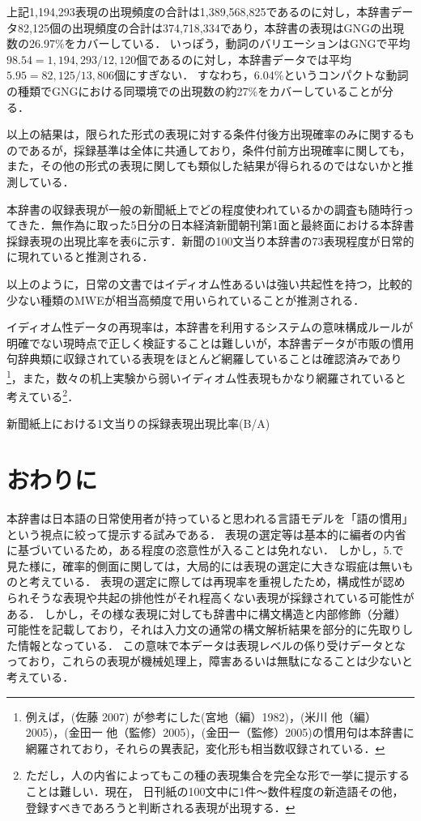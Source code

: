 \documentclass[japanese]{jnlp_1.4}
\begin{document}
上記1,194,293表現の出現頻度の合計は1,389,568,825であるのに対し，本辞書データ82,125個の出現頻度の合計は374,718,334であり，本辞書の表現はGNGの出現数の26.97\%をカバーしている．
いっぽう，動詞のバリエーションはGNGで平均$98.54 = 1,194,293/12,120$個であるのに対し，本辞書データでは平均$5.95=82,125/13,806$個にすぎない．
すなわち，6.04\%というコンパクトな動詞の種類でGNGにおける同環境での出現数の約27\%をカバーしていることが分る．

以上の結果は，限られた形式の表現に対する条件付後方出現確率のみに関するものであるが，採録基準は全体に共通しており，条件付前方出現確率に関しても，また，その他の形式の表現に関しても類似した結果が得られるのではないかと推測している．

本辞書の収録表現が一般の新聞紙上でどの程度使われているかの調査も随時行ってきた．無作為に取った5日分の日本経済新聞朝刊第1面と最終面における本辞書採録表現の出現比率を表6に示す．新聞の100文当り本辞書の73表現程度が日常的に現れていると推測される．

以上のように，日常の文書ではイディオム性あるいは強い共起性を持つ，比較的少ない種類のMWEが相当高頻度で用いられていることが推測される．

イディオム性データの再現率は，本辞書を利用するシステムの意味構成ルールが明確でない現時点で正しく検証することは難しいが，本辞書データが市販の慣用句辞典類に収録されている表現をほとんど網羅していることは確認済みであり\footnote{例えば，(佐藤 2007) が参考にした(宮地（編）1982)，(米川 他（編）2005)，(金田一 他（監修）2005)，(金田一（監修）2005)の慣用句は本辞書に網羅されており，それらの異表記，変化形も相当数収録されている．}，また，数々の机上実験から弱いイディオム性表現もかなり網羅されていると考えている\footnote{ただし，人の内省によってもこの種の表現集合を完全な形で一挙に提示することは難しい．現在， 日刊紙の100文中に1件〜数件程度の新造語その他，登録すべきであろうと判断される表現が出現する．}．

\begin{table}[t]
\caption{新聞紙上における1文当りの採録表現出現比率(B/A)}

\end{table}


\section{おわりに}

本辞書は日本語の日常使用者が持っていると思われる言語モデルを「語の慣用」という視点に絞って提示する試みである．
表現の選定等は基本的に編者の内省に基づいているため，ある程度の恣意性が入ることは免れない．
しかし，5.で見た様に，確率的側面に関しては，大局的には表現の選定に大きな瑕疵は無いものと考えている． 表現の選定に際しては再現率を重視したため，構成性が認められそうな表現や共起の排他性がそれ程高くない表現が採録されている可能性がある．
しかし，その様な表現に対しても辞書中に構文構造と内部修飾（分離）可能性を記載しており，それは入力文の通常の構文解析結果を部分的に先取りした情報となっている．
この意味で本データは表現レベルの係り受けデータとなっており，これらの表現が機械処理上，障害あるいは無駄になることは少ないと考えている．
\end{document}
